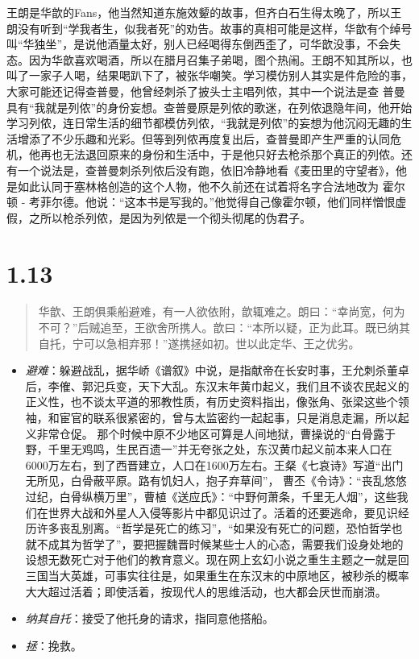 \documentclass[]{book}
\providecommand{\tightlist}{%
  \setlength{\itemsep}{0pt}\setlength{\parskip}{0pt}}
\begin{document}
王朗是华歆的Fans，他当然知道东施效颦的故事，但齐白石生得太晚了，所以王朗没有听到``学我者生，似我者死''的劝告。故事的真相可能是这样，华歆有个绰号叫``华独坐''，是说他酒量太好，别人已经喝得东倒西歪了，可华歆没事，不会失态。因为华歆喜欢喝酒，所以在腊月召集子弟喝，图个热闹。王朗不知其所以，也叫了一家子人喝，结果喝趴下了，被张华嘲笑。学习模仿别人其实是件危险的事，大家可能还记得查普曼，他曾经刺杀了披头士主唱列侬，其中一个说法是查
普曼具有``我就是列侬''的身份妄想。查普曼原是列侬的歌迷，在列侬退隐年间，他开始学习列侬，连日常生活的细节都模仿列侬，``我就是列侬''的妄想为他沉闷无趣的生活增添了不少乐趣和光彩。但等到列侬再度复出后，查普曼即产生严重的认同危机，他再也无法退回原来的身份和生活中，于是他只好去枪杀那个真正的列侬。还有一个说法是，查普曼刺杀列侬后没有跑，依旧冷静地看《麦田里的守望者》，他是如此认同于塞林格创造的这个人物，他不久前还在试着将名字合法地改为
霍尔顿 -
考菲尔德。他说：``这本书是写我的。''他觉得自己像霍尔顿，他们同样憎恨虚假，之所以枪杀列侬，是因为列侬是一个彻头彻尾的伪君子。

\section{1.13}\label{section-12}

\begin{quote}
华歆、王朗俱乘船避难，有一人欲依附，歆辄难之。朗曰：``幸尚宽，何为不可？''后贼追至，王欲舍所携人。歆曰：``本所以疑，正为此耳。既已纳其自托，宁可以急相弃邪！''遂携拯如初。世以此定华、王之优劣。
\end{quote}

\begin{itemize}
\tightlist
\item
  \emph{避难}：躲避战乱，据华峤《谱叙》中说，是指献帝在长安时事，王允刺杀董卓后，李傕、郭汜兵变，天下大乱。东汉末年黄巾起义，我们且不谈农民起义的正义性，也不谈太平道的邪教性质，有历史资料指出，像张角、张梁这些个领袖，和宦官的联系很紧密的，曾与太监密约一起起事，只是消息走漏，所以起义非常仓促。
  那个时候中原不少地区可算是人间地狱，曹操说的``白骨露于野，千里无鸡鸣，生民百遗一''并无夸张之处，东汉黄巾起义前本来人口在6000万左右，到了西晋建立，人口在1600万左右。王粲《七哀诗》写道``出门无所见，白骨蔽平原。路有饥妇人，抱子弃草间''，
  曹丕《令诗》：``丧乱悠悠过纪，白骨纵横万里''，曹植《送应氏》：``中野何萧条，千里无人烟''，这些我们在世界大战和外星人入侵等影片中都见识过了。活着的还要逃命，要见识经历许多丧乱别离。``哲学是死亡的练习''，``如果没有死亡的问题，恐怕哲学也就不成其为哲学了''，要把握魏晋时候某些士人的心态，需要我们设身处地的设想无数死亡对于他们的教育意义。现在网上玄幻小说之重生主题之一就是回三国当大英雄，可事实往往是，如果重生在东汉末的中原地区，被秒杀的概率大大超过活着；即使活着，按现代人的思维活动，也大都会厌世而崩溃。
\item
  \emph{纳其自托}：接受了他托身的请求，指同意他搭船。
\item
  \emph{拯}：挽救。
\end{itemize}
\end{document}
